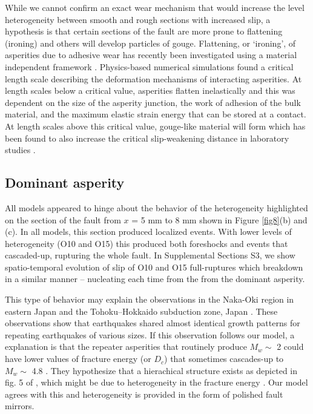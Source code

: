 \documentclass[preprint,1p, 10pt,authoryear]{elsarticle}
\begin{document}
While we cannot confirm an exact wear mechanism that would increase the level heterogeneity between smooth and rough sections with increased slip, a hypothesis is that certain sections of the fault are more prone to flattening (ironing) and others will develop particles of gouge. Flattening, or ‘ironing’, of asperities due to adhesive wear has recently been investigated using a material independent framework \citet{Aghababaei2016}. Physics-based numerical simulations found a critical length scale describing the deformation mechanisms of interacting asperities. At length scales below a critical value, asperities flatten inelastically and this was dependent on the size of the asperity junction, the work of adhesion of the bulk material, and the maximum elastic strain energy that can be stored at a contact. At length scales above this critical value, gouge-like material will form which has been found to also increase the critical slip-weakening distance in laboratory studies \citep{Marone1998}.   

\subsection{Dominant asperity}
All models appeared to hinge about the behavior of the heterogeneity highlighted on the section of the fault from $x$ = 5 mm to 8 mm shown in Figure \ref{fig8}(b) and (c). In all models, this section produced localized events. With lower levels of heterogeneity (O10 and O15) this produced both foreshocks and events that cascaded-up, rupturing the whole fault. In Supplemental Sections S3, we show spatio-temporal evolution of slip of O10 and O15 full-ruptures which breakdown in a similar manner -- nucleating each time from the from the dominant asperity.

This type of behavior may explain the observations in the Naka-Oki region in eastern Japan \citep{Okuda2018} and the Tohoku–Hokkaido subduction zone, Japan \citep{Ide2019}. These observations show that earthquakes shared almost identical growth patterns for repeating earthquakes of various sizes. If this observation follows our model, a explanation is that the repeater asperities that routinely produce  $M_{w} \sim$ 2  could have lower values of fracture energy (or $D_{c}$) that sometimes cascades-up to  $M_{w} \sim$ 4.8 \citep{Okuda2018a}.  They hypothesize that a hierachical structure exists as depicted in fig. 5 of \citet{Okuda2018}, which might be due to heterogeneity in the fracture energy \citep{Ide2005, Aochi2014, Aochi2017}. Our model agrees with this and heterogeneity is provided in the form of polished fault mirrors. 
\end{document}
